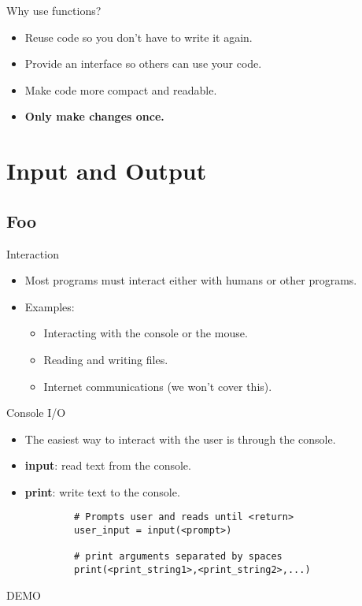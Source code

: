 \documentclass[serif,xcolor=pdftex,dvipsnames,table,hyperref={bookmarks=false,breaklinks}]{beamer}
\begin{document}
\begin{frame}[t]{Why use functions?}
	\begin{itemize}[<+->]
		\item Reuse code so you don't have to write it again.
		\item Provide an interface so others can use your code.
		\item Make code more compact and readable.
		\item \textbf{Only make changes once.}
	\end{itemize}
\end{frame}

\begin{frame}[t]{Functions and Parameters}
    \centering
    \texttt{[image: \{../Figures/function\_call]}.pdf}
\end{frame}

\section{Input and Output}
\subsection{Foo}

\begin{frame}[t]{Interaction}
	\begin{itemize}[<+->]
		\item Most programs must interact either with humans or other programs.
		\item Examples:
		\begin{itemize}[<+->]
			\item Interacting with the console or the mouse.
			\item Reading and writing files.
			\item Internet communications (we won't cover this).
		\end{itemize}
	\end{itemize}
\end{frame}

\begin{frame}[t,fragile]{Console I/O}
	\begin{itemize}[<+->]
		\item The easiest way to interact with the user is through the console.
		\item \textbf{input}: read text from the console.
		\item \textbf{print}: write text to the console.
	\end{itemize}

	\pause
	\begin{tcolorbox}
		\begin{verbatim}
			# Prompts user and reads until <return>
			user_input = input(<prompt>) 
			
			# print arguments separated by spaces
			print(<print_string1>,<print_string2>,...) 
		\end{verbatim}
	\end{tcolorbox}
	\pause
  \centering
  \Huge{DEMO}
\end{frame}
\end{document}
